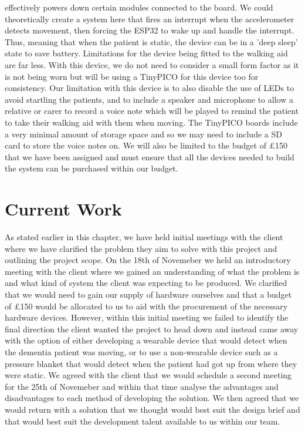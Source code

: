             effectively powers down certain modules connected to the board. We could theoretically create a system here
            that fires an interrupt when the accelerometer detects movement, then forcing the ESP32 to wake up and
            handle the interrupt. Thus, meaning that when the patient is static, the device can be in a 'deep sleep'
            state to save battery. Limitations for the device being fitted to the walking aid are far less. With this
            device, we do not need to consider a small form factor as it is not being worn but will be using a TinyPICO
            for this device too for consistency. Our limitation with this device is to also disable the use of LEDs to
            avoid startling the patients, and to include a speaker and microphone to allow a relative or carer to record
            a voice note which will be played to remind the patient to take their walking aid with them when moving. The
            TinyPICO boards include a very minimal amount of storage space and so we may need to include a SD card to
            store the voice notes on. We will also be limited to the budget of £150 that we have been assigned and must
            ensure that all the devices needed to build the system can be purchased within our budget.

    \section{Current Work}
        As stated earlier in this chapter, we have held initial meetings with the client where we have clarified the
        problem they aim to solve with this project and outlining the project scope. On the 18th of Novemeber we held an
        introductory meeting with the client where we gained an understanding of what the problem is and what kind of
        system the client was expecting to be produced. We clarified that we would need to gain our supply of hardware
        ourselves and that a budget of £150 would be allocated to us to aid with the procurement of the necessary
        hardware devices. However, within this initial meeting we failed to identify the final direction the client
        wanted the project to head down and instead came away with the option of either developing a wearable device
        that would detect when the dementia patient was moving, or to use a non-wearable device such as a pressure
        blanket that would detect when the patient had got up from where they were static. We agreed with the client
        that we would schedule a second meeting for the 25th of Novemeber and within that time analyse the advantages
        and disadvantages to each method of developing the solution. We then agreed that we would return with a solution
        that we thought would best suit the design brief and that would best suit the development talent available to us
        within our team.

